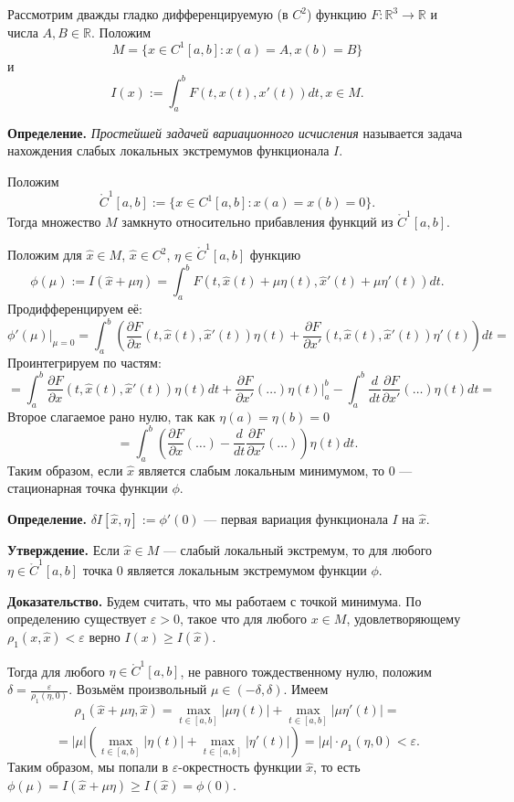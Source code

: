 Рассмотрим дважды гладко дифференцируемую (в $C^2$) функцию $F: \mathbb R^3 \to \mathbb R$ и числа $A, B \in \mathbb R$.
Положим
\[
    M = \{x \in C^1[a, b]: x(a) = A, x(b) = B\}
\]
и
\[
    I(x) := \int_a^b F(t, x(t), x'(t)) dt, x \in M.
\]

\textbf{Определение.} \textit{Простейшей задачей вариационного исчисления} называется задача нахождения слабых локальных экстремумов функционала $I$.

Положим
\[
    \mathring C^1[a, b] := \{x \in C^1[a, b]: x(a) = x(b) = 0\}.
\]
Тогда множество $M$ замкнуто относительно прибавления функций из $\mathring C^1[a, b]$.

Положим для $\widehat x \in M$, $\widehat x \in C^2$, $\eta \in \mathring C^1[a, b]$ функцию
\[
    \phi(\mu) := I(\widehat x + \mu \eta) = \int_a^b F(t, \widehat x(t) + \mu \eta(t), \widehat x'(t) + \mu \eta'(t)) dt.
\]
Продифференцируем её:
\[
    \phi'(\mu)|_{\mu = 0} = \int_a^b \left( \frac{\partial F}{\partial x}(t, \widehat x(t), \widehat x'(t)) \eta(t) + \frac{\partial F}{\partial x'}(t, \widehat x(t), \widehat x'(t)) \eta'(t) \right) dt =
\]
Проинтегрируем по частям:
\[
    = \int_a^b \frac{\partial F}{\partial x}(t, \widehat x(t), \widehat x'(t)) \eta(t) dt + \frac{\partial F}{\partial x'}(\dots) \eta(t) \big|_a^b - \int_a^b \frac{d}{dt} \frac{\partial F}{\partial x'}(\dots) \eta(t) dt =
\]
Второе слагаемое рано нулю, так как $\eta(a) = \eta(b) = 0$
\[
    = \int_a^b \left(\frac{\partial F}{\partial x}(\dots) - \frac{d}{dt} \frac{\partial F}{\partial x'}(\dots) \right) \eta(t) dt.
\]
Таким образом, если $\widehat x$ является слабым локальным минимумом, то 0 --- стационарная точка функции $\phi$.

\textbf{Определение.} $\delta I[\widehat x, \eta] := \phi'(0)$ --- первая вариация функционала $I$ на $\widehat x$.

\textbf{Утверждение.} Если $\widehat x \in M$ --- слабый локальный экстремум, то для любого $\eta \in \mathring C^1[a, b]$ точка $0$ является локальным экстремумом функции $\phi$.

\textbf{Доказательство.} Будем считать, что мы работаем с точкой минимума.
По определению существует $\varepsilon > 0$, такое что для любого $x \in M$, удовлетворяющему $\rho_1(x, \widehat x) < \varepsilon$ верно $I(x) \ge I(\widehat x)$.

Тогда для любого $\eta \in \mathring C^1[a, b]$, не равного тождественному нулю, положим $\delta = \frac{\varepsilon}{\rho_1(\eta, 0)}$.
Возьмём произвольный $\mu \in (-\delta, \delta)$.
Имеем
\[
    \rho_1(\widehat x + \mu \eta, \widehat x) = \max_{t \in [a, b]} |\mu \eta(t)| + \max_{t \in [a, b]} |\mu \eta'(t)| =
\]
\[
    = |\mu| \left( \max_{t \in [a, b]} |\eta(t)| + \max_{t \in [a, b]} |\eta'(t)| \right) = |\mu| \cdot \rho_1(\eta, 0) < \varepsilon.
\]
Таким образом, мы попали в $\varepsilon$-окрестность функции $\widehat x$, то есть $\phi(\mu) = I(\widehat x + \mu \eta) \ge I(\widehat x) = \phi(0)$.

